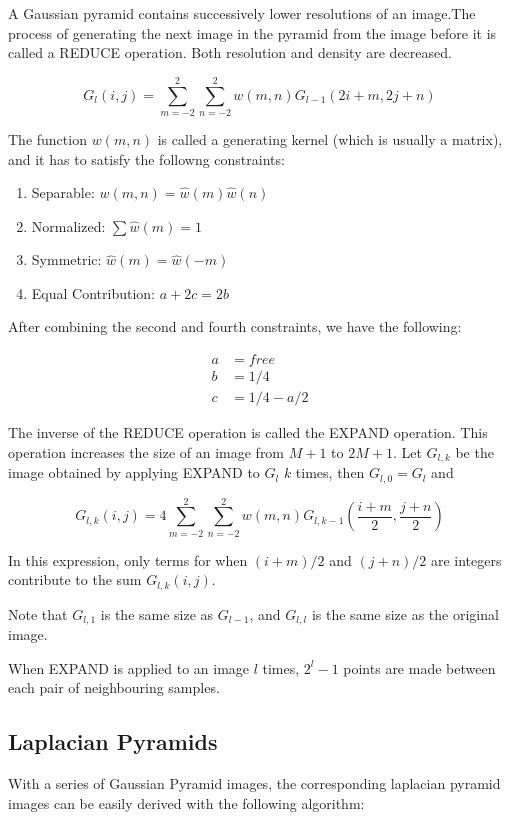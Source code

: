 \documentclass{article}
\begin{document}
\begin{multicols}{2}
A Gaussian pyramid contains successively lower resolutions of an image.The process of generating the next image in the pyramid from the image before it is called a REDUCE operation. Both resolution and density are decreased.

$$
G_l(i,j) = \sum_{m = -2}^2 \sum_{n = -2}^2 w(m,n) G_{l-1} (2i+m, 2j+n)
$$

The function $w(m, n)$ is called a generating kernel (which is usually a matrix), and it has to satisfy the followng constraints:

\begin{enumerate}
  \item {Separable: $w(m,n) = \hat{w}(m)\hat{w}(n)$}
  \item {Normalized: $\sum \hat{w}(m) = 1$}
  \item {Symmetric: $\hat{w}(m) = \hat{w}(-m)$}
  \item {Equal Contribution: $a+2c = 2b$}
\end{enumerate}

After combining the second and fourth constraints, we have the following:

\[
\begin{aligned}
  a &= free\\
  b &= 1/4\\
  c &= 1/4 - a/2
\end{aligned}
\]

The inverse of the REDUCE operation is called the EXPAND operation. This operation increases the size of an image from $M+1$ to $2M+1$. Let $G_{l,k}$ be the image obtained by applying EXPAND to $G_l$ $k$ times, then $G_{l,0} = G_{l}$ and

$$
G_{l,k}(i,j) = 4\sum_{m = -2}^2 \sum_{n = -2}^2 w(m,n) G_{l,k-1}(\frac{i+m}{2}, \frac{j+n}{2})
$$

In this expression, only terms for when $(i+m)/2$ and $(j+n)/2$ are integers contribute to the sum $G_{l,k}(i,j)$.

Note that $G_{l,1}$ is the same size as $G_{l-1}$, and $G_{l,l}$ is the same size as the original image.

When EXPAND is applied to an image $l$ times, $2^l-1$ points are made between each pair of neighbouring samples.

\subsection{Laplacian Pyramids}

With a series of Gaussian Pyramid images, the corresponding laplacian pyramid images can be easily derived with the following algorithm:


\end{multicols}
\end{document}
